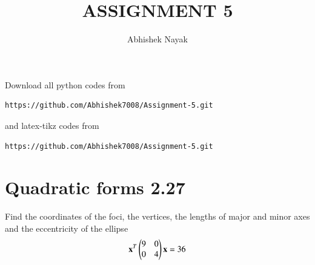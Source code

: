 \documentclass[journal,12pt,twocolumn]{IEEEtran}
\begin{document}
     \def\centbox#1{\makebox[0in]{#1}}
     \def\topbox#1{\raisebox{-\baselineskip}[0in][0in]{#1}}
     \def\midbox#1{\raisebox{-0.5\baselineskip}[0in][0in]{#1}}
\vspace{3cm}
\title{ASSIGNMENT 5}
\author{Abhishek Nayak}
\maketitle
\newpage
\bigskip
\renewcommand{\thefigure}{\theenumi}
\renewcommand{\thetable}{\theenumi}
Download all python codes from 
\begin{lstlisting}
https://github.com/Abhishek7008/Assignment-5.git
\end{lstlisting}
%
and latex-tikz codes from 
%
\begin{lstlisting}
https://github.com/Abhishek7008/Assignment-5.git
\end{lstlisting}
\section{Quadratic forms 2.27}
Find the coordinates of the foci, the vertices,
the lengths of major and minor axes and the
eccentricity of the ellipse
\begin{align}
  \mathbf{x}^T\begin{pmatrix}9&0\\0&4\end{pmatrix}\mathbf{x}=36   
\end{align}
%
\end{document}
